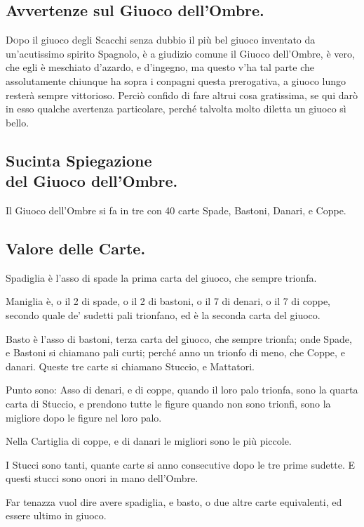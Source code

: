 \documentclass[11pt,a6paper]{article}
\begin{document}
\subsection{Avvertenze sul Giuoco dell'Ombre.}

\lettrine{D}opo il giuoco degli Scacchi senza
dubbio il più bel giuoco inventato da un'acutissimo
spirito Spagnolo, è a giudizio
comune il Giuoco dell'Ombre, è vero,
che egli è meschiato d'azardo, e d'ingegno,
ma questo v'ha tal parte che assolutamente
chiunque ha sopra i conpagni questa
prerogativa, a giuoco lungo resterà sempre
vittorioso. Perciò confido di fare altrui cosa
gratissima, se qui darò in esso qualche avertenza
particolare, perché talvolta molto diletta
un giuoco sì bello.

\subsection{Sucinta Spiegazione \\del Giuoco
dell'Ombre.}

Il Giuoco dell'Ombre si fa in tre con 40
carte Spade, Bastoni, Danari, e Coppe.

\subsection{Valore delle Carte.}

Spadiglia è l'asso di spade la prima carta
del giuoco, che sempre trionfa.

Maniglia è, o il 2 di spade, o il 2 di bastoni,
o il 7 di denari, o il 7 di coppe, secondo quale
de' sudetti pali trionfano, ed è la seconda carta del giuoco.

Basto è l'asso di bastoni, terza carta del giuoco,
che sempre trionfa; onde Spade, e Bastoni
si chiamano pali curti; perché anno un
trionfo di meno, che Coppe, e danari. Queste
tre carte si chiamano Stuccio, e Mattatori.

Punto sono: Asso di denari, e di coppe,
quando il loro palo trionfa, sono la quarta
carta di Stuccio, e prendono tutte le figure
quando non sono trionfi, sono la migliore
dopo le figure nel loro palo.

Nella Cartiglia di coppe, e di danari le
migliori sono le più piccole.

I Stucci sono tanti, quante carte si anno
consecutive dopo le tre prime sudette. E
questi stucci sono onori in mano dell'Ombre.

Far tenazza vuol dire avere spadiglia, e
basto, o due altre carte equivalenti, ed essere
ultimo in giuoco.
\end{document}

